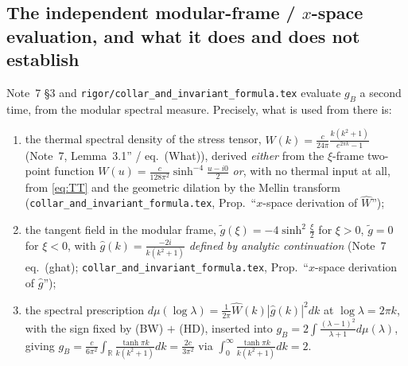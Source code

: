 \documentclass[11pt]{article}
\newcommand{\gB}{g_B}
\newcommand{\gt}{\widetilde g}
\newcommand{\gh}{\widehat g}
\newcommand{\Wh}{\widehat W}
\begin{document}
\subsection{The independent modular-frame / $x$-space evaluation, and what it does and does not establish}

Note~7 \S3 and \texttt{rigor/collar\_and\_invariant\_formula.tex} evaluate $\gB$ a second time, from the
modular spectral measure.  Precisely, what is used from there is:
\begin{enumerate}[leftmargin=1.7em]
\item the thermal spectral density of the stress tensor,
 $\Wh(k)=\frac{c}{24\pi}\frac{k(k^2+1)}{e^{2\pi k}-1}$ (Note~7, Lemma~3.1'' / eq.~(What)), derived
 \emph{either} from the $\xi$-frame two-point function $W(u)=\frac{c}{128\pi^2}\sinh^{-4}\frac{u-i0}2$
 \emph{or}, with no thermal input at all, from \eqref{eq:TT} and the geometric dilation by the Mellin
 transform (\texttt{collar\_and\_invariant\_formula.tex}, Prop.~``$x$-space derivation of $\Wh$'');
\item the tangent field in the modular frame,
 $\gt(\xi)=-4\sinh^2\frac\xi2$ for $\xi>0$, $\gt=0$ for $\xi<0$, with
 $\gh(k)=\frac{-2i}{k(k^2+1)}$ \emph{defined by analytic continuation}
 (Note~7 eq.~(ghat); \texttt{collar\_and\_invariant\_formula.tex}, Prop.~``$x$-space derivation of $\gh$'');
\item the spectral prescription $d\mu(\log\lambda)=\frac1{2\pi}\Wh(k)|\gh(k)|^2dk$ at $\log\lambda=2\pi k$,
 with the sign fixed by (BW) $+$ (HD), inserted into
 $\gB=2\int\frac{(\lambda-1)^2}{\lambda+1}d\mu(\lambda)$, giving
 $\gB=\frac{c}{6\pi^2}\int_{\mathbb R}\frac{\tanh\pi k}{k(k^2+1)}dk=\frac{2c}{3\pi^2}$ via
 $\int_0^\infty\frac{\tanh\pi k}{k(k^2+1)}dk=2$.
\end{enumerate}
\end{document}
